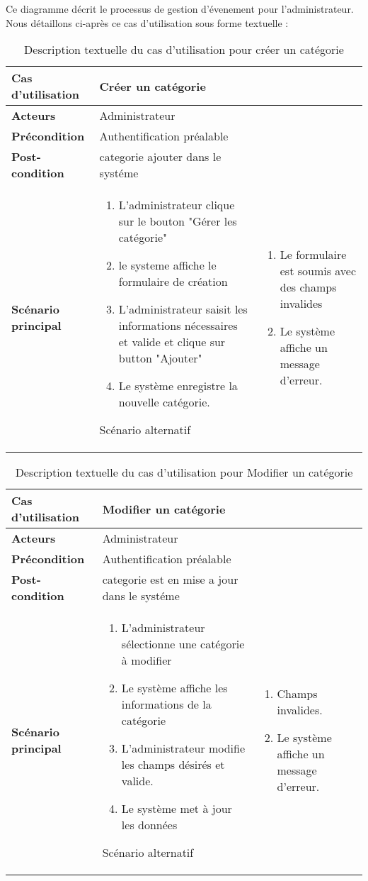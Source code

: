 Ce diagramme décrit le processus de gestion d'évenement pour l'administrateur. Nous détaillons ci-après ce cas d’utilisation sous forme textuelle :
\begin{longtable}{|>{\bfseries}p{4cm}|p{10cm}|}
\hline
Cas d’utilisation &  Créer un catégorie \\
\hline
Acteurs & Administrateur \\
\hline
Précondition & Authentification préalable\\
\hline
Post-condition & categorie ajouter dans le systéme\\
\hline
Scénario principal & 
\begin{enumerate}
  \item   L’administrateur clique sur le bouton "Gérer les catégorie"
    \item le systeme affiche le formulaire de création
  \item   L’administrateur saisit les informations nécessaires et valide et clique sur button "Ajouter"
  \item Le système enregistre la nouvelle catégorie.

\end{enumerate} 
\hline
Scénario alternatif & 
\begin{enumerate}
    \item Le formulaire est soumis avec des champs invalides
    \item Le système affiche un message d’erreur.
\end{enumerate}
 \hline
\caption{Description textuelle du cas d’utilisation pour créer un catégorie }
\end{longtable}
\clearpage
\begin{longtable}{|>{\bfseries}p{4cm}|p{10cm}|}
\hline
Cas d’utilisation &  Modifier un catégorie \\
\hline
Acteurs & Administrateur \\
\hline
Précondition & Authentification préalable\\
\hline
Post-condition & categorie est en mise a jour dans le systéme\\
\hline
Scénario principal & 
\begin{enumerate}
  \item  L’administrateur sélectionne une catégorie à modifier
    \item Le système affiche les informations de la catégorie
  \item   L’administrateur modifie les champs désirés et valide.
  \item  Le système met à jour les données

\end{enumerate} 
\hline
Scénario alternatif & 
\begin{enumerate}
    \item Champs invalides.
    \item Le système affiche un message d’erreur.
\end{enumerate}
 \hline
\caption{Description textuelle du cas d’utilisation pour   Modifier un catégorie }
\end{longtable}


